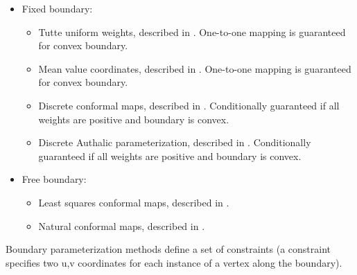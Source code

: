 \begin{itemize}

\item Fixed boundary:

    \begin{itemize}

    \item Tutte uniform weights, described in \cite{cgal:fh-survey-05}.
    One-to-one mapping is guaranteed for convex boundary.

    \item Mean value coordinates, described in \cite{cgal:f-mvc-03}.
    One-to-one mapping is guaranteed for convex boundary.

    \item Discrete conformal maps, described in \cite{cgal:fh-survey-05}.
    Conditionally guaranteed if all weights are positive and boundary is convex.

    \item Discrete Authalic parameterization, described in \cite{cgal:dma-ipsm-02}.
    Conditionally guaranteed if all weights are positive and boundary is convex.

    \end{itemize}

\item Free boundary:

    \begin{itemize}

    \item Least squares conformal maps, described in \cite{cgal:lprm-lscm-02}.

    \item Natural conformal maps, described in \cite{cgal:dma-ipsm-02}.

    \end{itemize}

\end{itemize}



Boundary parameterization methods define a
set of constraints (a constraint specifies two u,v coordinates for
each instance of a vertex along the boundary).

